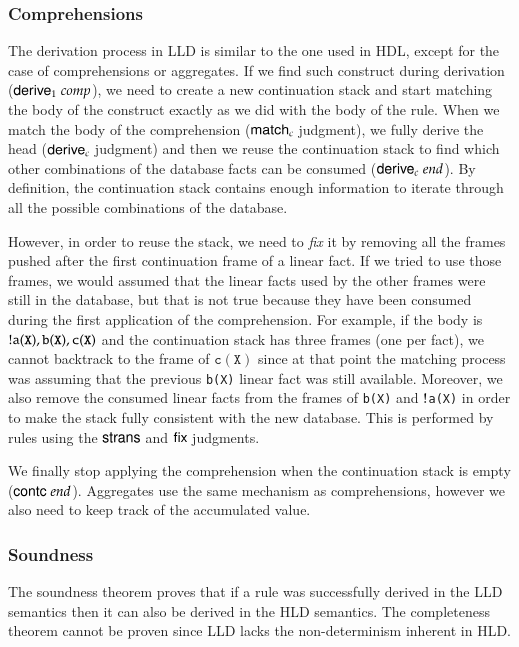 \subsubsection{Comprehensions}

The derivation process in LLD is similar to the one used in HDL, except for the case of comprehensions or aggregates. If we find such construct during
derivation ($\mathsf{derive}_1 \; comp$), we need to create a new continuation stack and start matching the body of the construct exactly as we did with the body of the rule.
When we match the body of the comprehension ($\mathsf{match}_c \;$judgment), we fully derive the head ($\mathsf{derive}_c \;$judgment) and then we reuse the continuation stack to find which other combinations of the
database facts can be consumed ($\mathsf{derive}_c \; end$). By definition, the continuation stack contains enough information to iterate through all the possible combinations
of the database.

However, in order to reuse the stack, we need to \emph{fix} it by removing all the frames pushed after the first continuation frame
of a linear fact. If we tried to use those frames, we would assumed that the linear facts used by the other frames were still in the database, but that
is not true because they have been consumed during the first application of the comprehension.
For example, if the body is ${!}\mathtt{a(X), b(X), c(X)}$ and the continuation stack has three frames (one per fact), we cannot backtrack to the frame of $\mathtt{c(X)}$
since at that point the matching process was assuming that the previous \texttt{b(X)} linear fact was still available.
Moreover, we also remove the consumed linear facts
from the frames of \texttt{b(X)} and ${!}$\texttt{a(X)} in order to make the stack fully consistent with the new database.
This is performed by rules using the $\mathsf{strans} \;$and $\mathsf{fix} \;$judgments.

We finally stop applying the comprehension when the continuation stack is empty ($\mathsf{contc} \; end$). 
Aggregates use the same mechanism as comprehensions, however we also need to keep track of the accumulated value.

\subsubsection{Soundness}

The soundness theorem proves that if a rule was successfully derived in the LLD semantics then it can also be derived in the HLD semantics. The completeness theorem cannot
be proven since LLD lacks the non-determinism inherent in HLD.

